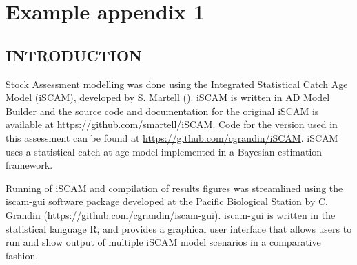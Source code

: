 \documentclass[11pt]{book}\usepackage[]{graphicx}\usepackage[]{color}
\begin{document}




\def\beq{\vspace{-5ex} \begin{fleqn} \begin{equation}}
\def\eeq{\end{equation} \end{fleqn} \vspace{-5ex}}
\def\tabline{\vspace{2ex} \hrule \vspace{2ex}}
\def\newp{\vfill \break}

\clearpage

\chapter{Example appendix 1}
\label{chap:example.1}

\section{INTRODUCTION}

Stock Assessment modelling was done using the Integrated Statistical Catch Age Model (iSCAM), developed by S. Martell (\citet{martell2011}). iSCAM is written in AD Model Builder and the source code and documentation for the original iSCAM is available at \hyperref[https://github.com/smartell/iSCAM]{\color{blue}https://github.com/smartell/iSCAM}. Code for the version used in this assessment can be found at \hyperref[https://github.com/cgrandin/iSCAM]{\color{blue}https://github.com/cgrandin/iSCAM}. iSCAM uses a statistical catch-at-age model implemented in a Bayesian estimation framework.

Running of iSCAM and compilation of results figures was streamlined using the iscam-gui software package developed at the Pacific Biological Station by C. Grandin (\hyperref[https://github.com/cgrandin/iscam-gui]{\color{blue}https://github.com/cgrandin/iscam-gui}). iscam-gui is written in the statistical language R, and provides a graphical user interface that allows users to run and show output of multiple iSCAM model scenarios in a comparative fashion.
\end{document}
